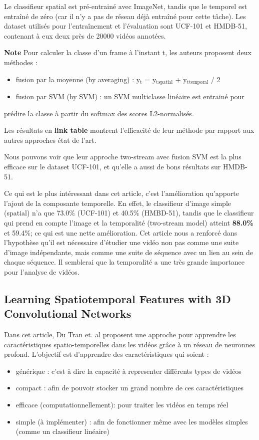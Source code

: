 \documentclass[11pt]{article}
\begin{document}
Le classifieur spatial est pré-entrainé avec ImageNet, tandis que le temporel
est entraîné de zéro (car il n'y a pas de réseau déjà entraîné pour cette tâche).
Les dataset utilisés pour l'entraînement et l'évaluation sont UCF-101 et HMDB-51,
contenant à eux deux près de 20000 vidéos annotées.

\textbf{Note} Pour calculer la classe d'un frame à l'instant t, les auteurs proposent
deux méthodes :
\begin{itemize}
\item fusion par la moyenne (by averaging) : y\(_{\text{t}}\) = y\(_{\text{t}}\)\(_{\text{spatial}}\) + y\(_{\text{t}}\)\(_{\text{temporal}}\) / 2
\item fusion par SVM (by SVM) : un SVM multiclasse linéaire est entrainé pour
\end{itemize}
prédire la classe à partir du softmax des scores L2-normalisés.

Les résultats en \textbf{link table} montrent l'efficacité de leur méthode par rapport
aux autres approches état de l'art.

Nous pouvons voir que leur approche two-stream avec fusion SVM est la plus
efficace sur le dataset UCF-101, et qu'elle a aussi de bons résultats sur
HMDB-51.

Ce qui est le plus intéressant dans cet article, c'est l'amélioration
qu'apporte l'ajout de la composante temporelle.
En effet, le classifieur d'image simple (spatial) n'a que 73.0\% (UCF-101) et 40.5\% (HMBD-51), tandis que le classifieur qui prend en compte l'image et la temporalité (two-stream model) atteint \textbf{88.0\%} et 59.4\%; ce qui est une nette amélioration.
Cet article nous a renforcé dans l'hypothèse qu'il est nécessaire d'étudier une vidéo non pas comme une suite d'image indépendante, mais comme une suite de séquence avec un lien au sein de chaque séquence.
Il semblerai que la temporalité a une très grande importance pour  l'analyse de vidéos.

\subsection{Learning Spatiotemporal Features with 3D Convolutional Networks}
\label{sec:orgdf5c403}

Dans cet article, Du Tran et. al proposent une approche pour apprendre les caractéristiques spatio-temporelles dans les vidéos grâce à un réseau de neuronnes profond.
L'objectif est d'apprendre des caractéristiques qui soient :
\begin{itemize}
\item générique : c'est à dire la capacité à representer différents types de vidéos
\item compact : afin de pouvoir stocker un grand nombre de ces caractéristiques
\item efficace (computationnellement): pour traiter les vidéos en temps réel
\item simple (à implémenter) : afin de fonctionner même avec les modèles simples (comme un classifieur linéaire)
\end{itemize}
\end{document}
